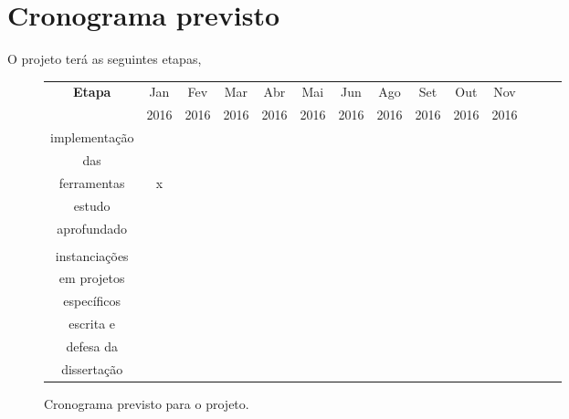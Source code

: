 \section{Cronograma previsto}
\label{sec-cronograma}

O projeto terá as seguintes etapas, 

\begin{figure}[hbt!]
\begin{center}
\begin{tabular}{||c||c|c|c|c|c|c|c|c|c|c|c|c|c||}
\hline\hline
{\bf Etapa} & Jan  & Fev & Mar &  Abr & Mai & Jun & Ago & Set & Out & Nov  \\
            & 2016 & 2016 &2016& 2016 & 2016& 2016& 2016& 2016& 2016& 2016 \\
\hline\hline
implementação       &   &   &   &   &   &   &   &  & &  \\
das                 &   &   &   &   &   &   &   &  & &  \\ 
ferramentas         &  x &   &   &   &   &   &   &  & &  \\ \hline

estudo              &   &   &   &   &   &   &   &  & &  \\
aprofundado         &   &   &   &   &   &   &   &  & &  \\ 
		            &   &   &   &   &   &   &   &  & &  \\ \hline

instanciações       &   &   &   &   &   &   &   &  & &  \\ 
em projetos         &   &   &   &   &   &   &   &  & &  \\
específicos         &   &   &   &   &   &   &   &  & &  \\ \hline

escrita e           &   &   &   &   &   &   &   &  & &  \\
defesa  da          &   &   &   &   &   &   &   &  & &  \\
dissertação         &   &   &   &   &   &   &   &  & &  \\ 
\hline\hline
\end{tabular}
\end{center}
\label{fig-cronograma}
\caption{Cronograma previsto para o projeto.}
\end{figure}
